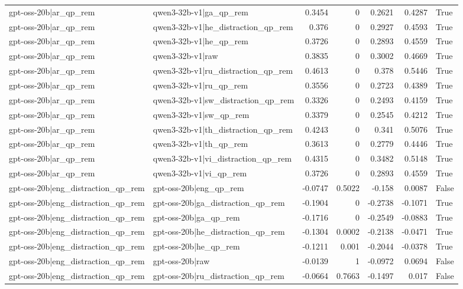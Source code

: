 \begin{table}
\begin{tabular}{l l r r r r l}
gpt-oss-20b|ar_qp_rem & qwen3-32b-v1|ga_qp_rem & 0.3454 & 0 & 0.2621 & 0.4287 & True \\
gpt-oss-20b|ar_qp_rem & qwen3-32b-v1|he_distraction_qp_rem & 0.376 & 0 & 0.2927 & 0.4593 & True \\
gpt-oss-20b|ar_qp_rem & qwen3-32b-v1|he_qp_rem & 0.3726 & 0 & 0.2893 & 0.4559 & True \\
gpt-oss-20b|ar_qp_rem & qwen3-32b-v1|raw & 0.3835 & 0 & 0.3002 & 0.4669 & True \\
gpt-oss-20b|ar_qp_rem & qwen3-32b-v1|ru_distraction_qp_rem & 0.4613 & 0 & 0.378 & 0.5446 & True \\
gpt-oss-20b|ar_qp_rem & qwen3-32b-v1|ru_qp_rem & 0.3556 & 0 & 0.2723 & 0.4389 & True \\
gpt-oss-20b|ar_qp_rem & qwen3-32b-v1|sw_distraction_qp_rem & 0.3326 & 0 & 0.2493 & 0.4159 & True \\
gpt-oss-20b|ar_qp_rem & qwen3-32b-v1|sw_qp_rem & 0.3379 & 0 & 0.2545 & 0.4212 & True \\
gpt-oss-20b|ar_qp_rem & qwen3-32b-v1|th_distraction_qp_rem & 0.4243 & 0 & 0.341 & 0.5076 & True \\
gpt-oss-20b|ar_qp_rem & qwen3-32b-v1|th_qp_rem & 0.3613 & 0 & 0.2779 & 0.4446 & True \\
gpt-oss-20b|ar_qp_rem & qwen3-32b-v1|vi_distraction_qp_rem & 0.4315 & 0 & 0.3482 & 0.5148 & True \\
gpt-oss-20b|ar_qp_rem & qwen3-32b-v1|vi_qp_rem & 0.3726 & 0 & 0.2893 & 0.4559 & True \\
gpt-oss-20b|eng_distraction_qp_rem & gpt-oss-20b|eng_qp_rem & -0.0747 & 0.5022 & -0.158 & 0.0087 & False \\
gpt-oss-20b|eng_distraction_qp_rem & gpt-oss-20b|ga_distraction_qp_rem & -0.1904 & 0 & -0.2738 & -0.1071 & True \\
gpt-oss-20b|eng_distraction_qp_rem & gpt-oss-20b|ga_qp_rem & -0.1716 & 0 & -0.2549 & -0.0883 & True \\
gpt-oss-20b|eng_distraction_qp_rem & gpt-oss-20b|he_distraction_qp_rem & -0.1304 & 0.0002 & -0.2138 & -0.0471 & True \\
gpt-oss-20b|eng_distraction_qp_rem & gpt-oss-20b|he_qp_rem & -0.1211 & 0.001 & -0.2044 & -0.0378 & True \\
gpt-oss-20b|eng_distraction_qp_rem & gpt-oss-20b|raw & -0.0139 & 1 & -0.0972 & 0.0694 & False \\
gpt-oss-20b|eng_distraction_qp_rem & gpt-oss-20b|ru_distraction_qp_rem & -0.0664 & 0.7663 & -0.1497 & 0.017 & False \\

\end{tabular}
\end{table}
